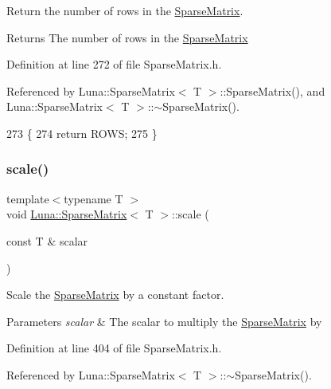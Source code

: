 Return the number of rows in the \hyperlink{classLuna_1_1SparseMatrix}{Sparse\+Matrix}. 

\begin{DoxyReturn}{Returns}
The number of rows in the \hyperlink{classLuna_1_1SparseMatrix}{Sparse\+Matrix} 
\end{DoxyReturn}


Definition at line 272 of file Sparse\+Matrix.\+h.



Referenced by Luna\+::\+Sparse\+Matrix$<$ T $>$\+::\+Sparse\+Matrix(), and Luna\+::\+Sparse\+Matrix$<$ T $>$\+::$\sim$\+Sparse\+Matrix().


\begin{DoxyCode}
273   \{
274     \textcolor{keywordflow}{return} ROWS;
275   \}
\end{DoxyCode}
\mbox{\label{classLuna_1_1SparseMatrix_aacf1e09ba5c58c5d925323ae2a8996d0}} 
\subsubsection{\texorpdfstring{scale()}{scale()}}
{\footnotesize\ttfamily template$<$typename T $>$ \\
void \hyperlink{classLuna_1_1SparseMatrix}{Luna\+::\+Sparse\+Matrix}$<$ T $>$\+::scale (\begin{DoxyParamCaption}\item[{const T \&}]{scalar }\end{DoxyParamCaption})\hspace{0.3cm}{\ttfamily [inline]}}



Scale the \hyperlink{classLuna_1_1SparseMatrix}{Sparse\+Matrix} by a constant factor. 


\begin{DoxyParams}{Parameters}
{\em scalar} & The scalar to multiply the \hyperlink{classLuna_1_1SparseMatrix}{Sparse\+Matrix} by \\
\hline
\end{DoxyParams}


Definition at line 404 of file Sparse\+Matrix.\+h.



Referenced by Luna\+::\+Sparse\+Matrix$<$ T $>$\+::$\sim$\+Sparse\+Matrix().


